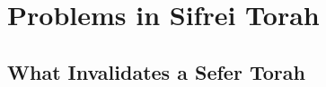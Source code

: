 \documentclass[11pt]{article}
\begin{document}
%
%
%
%
%

\section{Problems in Sifrei Torah}

\subsection{What Invalidates a Sefer Torah}
\end{document}
